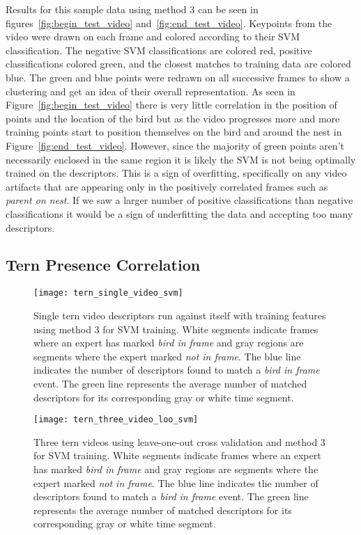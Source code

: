 Results for this sample data using method 3 can be seen in figures~\ref{fig:begin_test_video} and~\ref{fig:end_test_video}. Keypoints from the video were drawn on each frame and colored according to their SVM classification. The negative SVM classifications are colored red, positive classifications colored green, and the closest matches to training data are colored blue. The green and blue points were redrawn on all successive frames to show a clustering and get an idea of their overall representation. As seen in Figure~\ref{fig:begin_test_video} there is very little correlation in the position of points and the location of the bird but as the video progresses more and more training points start to position themselves on the bird and around the nest in Figure~\ref{fig:end_test_video}. However, since the majority of green points aren't necessarily enclosed in the same region it is likely the SVM is not being optimally trained on the descriptors. This is a sign of overfitting, specifically on any video artifacts that are appearing only in the positively correlated frames such as \emph{parent on nest}. If we saw a larger number of positive classifications than negative classifications it would be a sign of underfitting the data and accepting too many descriptors.

\subsection{Tern Presence Correlation}
\label{sec:tern_correlation}

\begin{figure}
\centering
\texttt{[image: tern\_single\_video\_svm]}
\caption{Single tern video descriptors run against itself with training features using method 3 for SVM training. White segments indicate frames where an expert has marked \emph{bird in frame} and gray regions are segments where the expert marked \emph{not in frame}. The blue line indicates the number of descriptors found to match a \emph{bird in frame} event. The green line represents the average number of matched descriptors for its corresponding gray or white time segment.}
\label{fig:tern_single_video}
\end{figure}

\begin{figure}
\centering
\texttt{[image: tern\_three\_video\_loo\_svm]}
\caption{Three tern videos using leave-one-out cross validation and method 3 for SVM training. White segments indicate frames where an expert has marked \emph{bird in frame} and gray regions are segments where the expert marked \emph{not in frame}. The blue line indicates the number of descriptors found to match a \emph{bird in frame} event. The green line represents the average number of matched descriptors for its corresponding gray or white time segment.}
\label{fig:tern_three_video}
\end{figure}

